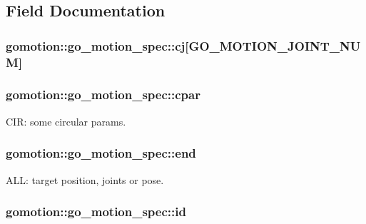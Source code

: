 \subsection{Field Documentation}
\hypertarget{structgomotion_1_1go__motion__spec_ac585087da484a433071bfa02e712a979}{
\subsubsection[{cj}]{ gomotion\-::go\-\_\-motion\-\_\-spec\-::cj\mbox{[}{\bf G\-O\-\_\-\-M\-O\-T\-I\-O\-N\-\_\-\-J\-O\-I\-N\-T\-\_\-\-N\-U\-M}\mbox{]}}}\label{structgomotion_1_1go__motion__spec_ac585087da484a433071bfa02e712a979}
\hypertarget{structgomotion_1_1go__motion__spec_a4f8c8e620396ab92594d65f1d98bbdcc}{
\subsubsection[{cpar}]{ gomotion\-::go\-\_\-motion\-\_\-spec\-::cpar}}\label{structgomotion_1_1go__motion__spec_a4f8c8e620396ab92594d65f1d98bbdcc}


C\-I\-R\-: some circular params. 

\hypertarget{structgomotion_1_1go__motion__spec_a8e19d2d27bfa3a3c633bae73641f4e45}{
\subsubsection[{end}]{ gomotion\-::go\-\_\-motion\-\_\-spec\-::end}}\label{structgomotion_1_1go__motion__spec_a8e19d2d27bfa3a3c633bae73641f4e45}


A\-L\-L\-: target position, joints or pose. 

\hypertarget{structgomotion_1_1go__motion__spec_a09732ca7aaddfa7a637f171766329931}{
\subsubsection[{id}]{ gomotion\-::go\-\_\-motion\-\_\-spec\-::id}}\label{structgomotion_1_1go__motion__spec_a09732ca7aaddfa7a637f171766329931}


